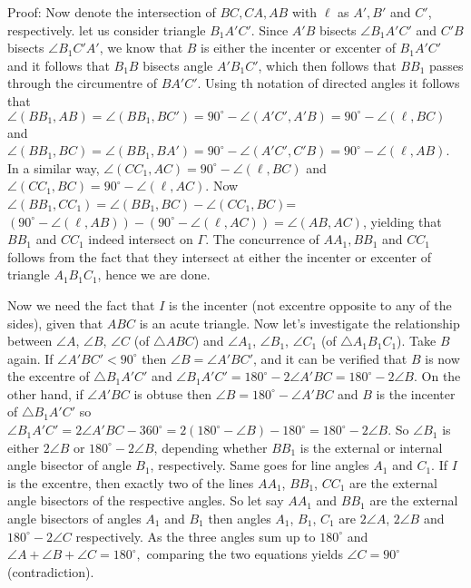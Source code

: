 \documentclass[11pt,a4paper]{article}
\begin{document}
\begin{enumerate}
	Proof: 
	Now denote the intersection of $BC, CA, AB$ with $\ell$ as $A',B'$ and $C'$, respectively. let us consider triangle $B_1A'C'$. Since $A'B$ bisects $\angle B_1A'C'$ and $C'B$ bisects $\angle B_1C'A'$, we know that $B$ is either the incenter or excenter of $B_1A'C'$ and it follows that $B_1B$ bisects angle $A'B_1C'$, which then follows that $BB_1$ passes through the circumentre of $BA'C'$. Using th notation of directed angles it follows that $\angle (BB_1,AB)=\angle (BB_1,BC')=90^{\circ}-\angle (A'C',A'B)=90^{\circ}-\angle (\ell, BC)$ and $\angle (BB_1,BC)=\angle (BB_1,BA')=90^{\circ}-\angle (A'C',C'B)=90^{\circ}-\angle (\ell,AB)$. In a similar way, $\angle (CC_1,AC)=90^{\circ}-\angle (\ell, BC)$ and $\angle (CC_1,BC)=90^{\circ}-\angle (\ell, AC).$ Now $\angle (BB_1,CC_1)=\angle (BB_1, BC)-\angle (CC_1, BC)$=$(90^{\circ}-\angle (\ell,AB))-(90^{\circ}-\angle (\ell,AC))=\angle (AB, AC)$, yielding that $BB_1$ and $CC_1$ indeed intersect on $\Gamma$. The concurrence of $AA_1, BB_1$ and $CC_1$ follows from the fact that they intersect at either the incenter or excenter of triangle $A_1B_1C_1$, hence we are done.
	
	Now we need the fact that $I$ is the incenter (not excentre opposite to any of the sides), given that $ABC$ is an acute triangle. Now let's investigate the relationship between $\angle A$, $\angle B$, $\angle C$ (of $\triangle ABC$) and $\angle A_1$, $\angle B_1$, $\angle C_1$ (of $\triangle A_1B_1C_1$). Take $B$ again. If $\angle A'BC'<90^{\circ}$ then $\angle B=\angle A'BC'$, and it can be verified that $B$ is now the excentre of $\triangle B_1A'C'$ and $\angle B_1A'C'=180^{\circ}-2\angle A'BC=180^{\circ}-2\angle B$. On the other hand, if $\angle A'BC$ is obtuse then $\angle B=180^{\circ}-\angle A'BC$ and $B$ is the incenter of $\triangle B_1A'C'$ so $\angle B_1A'C'=2\angle A'BC-360^{\circ}=2(180^{\circ}-\angle B)-180^{\circ}=180^{\circ}-2\angle B.$ So $\angle B_1$ is either $2\angle B$ or $180^{\circ}-2\angle B$, depending whether $BB_1$ is the external or internal angle bisector of angle $B_1$, respectively. Same goes for line angles $A_1$ and $C_1$. If $I$ is the excentre, then exactly two of the lines $AA_1$, $BB_1$, $CC_1$ are the external angle bisectors of the respective angles. So let say $AA_1$ and $BB_1$ are the external angle bisectors of angles $A_1$ and $B_1$ then angles $A_1$, $B_1$, $C_1$ are $2\angle A$, $2\angle B$ and $180^{\circ}-2\angle C$ respectively. As the three angles sum up to $180^{\circ}$ and $\angle A+\angle B+\angle C=180^{\circ},$ comparing the two equations yields $\angle C=90^{\circ}$ (contradiction).
	

\end{enumerate}
\end{document}
